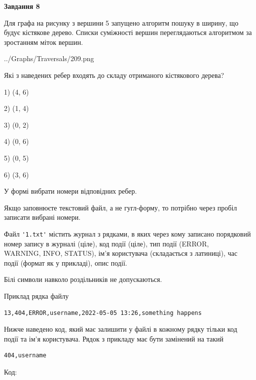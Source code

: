 \documentclass[12pt, ukrainian]{article}
\def\code#1{\Verb!#1!}
\begin{document}
{\begin {large}
{\begin {center}\textbf{Завдання 8}\end {center}}\par
Для графа на рисунку з вершини 5 запущено алгоритм пошуку в ширину, що будує кістякове дерево. Списки суміжності вершин переглядаються алгоритмом за зростанням міток вершин.\par
\begin{center}
	{../Graphs/Traversals/209.png}
\end{center}
\par Які з наведених ребер входять до складу отриманого кістякового дерева?\par
1) (4, 6)\par
2) (1, 4)\par
3) (0, 2)\par
4) (0, 6)\par
5) (0, 5)\par
6) (3, 6)\par
{\vskip 15pt} У формі вибрати номери відповідних ребер.


Якщо заповнюєте текстовий файл, а не гугл-форму, то потрібно через пробіл записа\-ти вибрані номери.\par
\newpage


Файл \code{'1.txt'} містить журнал з рядками, в яких через кому записано поряд\-ко\-вий номер запису в журналі (ціле), код події (ціле), тип події (ERROR, \\WARNING, INFO, STATUS), ім'я користувача (складається з латиниці), час події (фор\-мат як у прикладі), опис події.

Білі символи навколо роздільників не допускаються.

Приклад рядка файлу



\begin{verbatim}
13,404,ERROR,username,2022-05-05 13:26,something happens
\end{verbatim}


Нижче наведено код, який має залишити у файлі в кожному рядку тільки код події та ім'я користувача. Рядок з прикладу має бути замінений на такий



\begin{verbatim}
404,username
\end{verbatim}




Код:




\end{large}}
\end{document}
